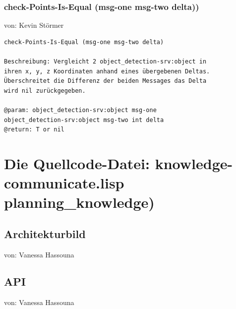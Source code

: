 \documentclass{suturo}
\makeatletter
\newcommand{\chapterauthor}[1]{%
  {\parindent0pt\vspace*{-27pt}%
  \linespread{0}\small\begin{flushright}von: #1\end{flushright}%
  \par\nobreak\vspace*{0pt}}
  \@afterheading%
}
\makeatother
\begin{document}
\subsubsection{check-Points-Is-Equal (msg-one msg-two delta))}
\chapterauthor{Kevin Störmer}
\begin{verbatim}
check-Points-Is-Equal (msg-one msg-two delta)

Beschreibung: Vergleicht 2 object_detection-srv:object in
ihren x, y, z Koordinaten anhand eines übergebenen Deltas.
Überschreitet die Differenz der beiden Messages das Delta
wird nil zurückgegeben.

@param: object_detection-srv:object msg-one 
object_detection-srv:object msg-two int delta
@return: T or nil
\end{verbatim}

\section{Die Quellcode-Datei: knowledge-communicate.lisp\\
planning\_knowledge)}

\subsection{Architekturbild}
\chapterauthor{Vanessa Hassouna}

\begin{figure}[!htb]
\end{figure}

\subsection{API}
\chapterauthor{Vanessa Hassouna}
\end{document}
